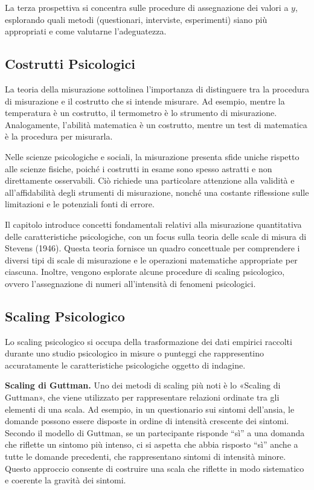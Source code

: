 \documentclass[
  letterpaper,
]{krantz}
\begin{document}
La terza prospettiva si concentra sulle procedure di assegnazione dei
valori a \(y\), esplorando quali metodi (questionari, interviste,
esperimenti) siano più appropriati e come valutarne l'adeguatezza.

\subsection{Costrutti Psicologici}\label{costrutti-psicologici}

La teoria della misurazione sottolinea l'importanza di distinguere tra
la procedura di misurazione e il costrutto che si intende misurare. Ad
esempio, mentre la temperatura è un costrutto, il termometro è lo
strumento di misurazione. Analogamente, l'abilità matematica è un
costrutto, mentre un test di matematica è la procedura per misurarla.

Nelle scienze psicologiche e sociali, la misurazione presenta sfide
uniche rispetto alle scienze fisiche, poiché i costrutti in esame sono
spesso astratti e non direttamente osservabili. Ciò richiede una
particolare attenzione alla validità e all'affidabilità degli strumenti
di misurazione, nonché una costante riflessione sulle limitazioni e le
potenziali fonti di errore.

Il capitolo introduce concetti fondamentali relativi alla misurazione
quantitativa delle caratteristiche psicologiche, con un focus sulla
teoria delle scale di misura di Stevens (1946). Questa teoria fornisce
un quadro concettuale per comprendere i diversi tipi di scale di
misurazione e le operazioni matematiche appropriate per ciascuna.
Inoltre, vengono esplorate alcune procedure di scaling psicologico,
ovvero l'assegnazione di numeri all'intensità di fenomeni psicologici.

\subsection{Scaling Psicologico}\label{scaling-psicologico}

Lo scaling psicologico si occupa della trasformazione dei dati empirici
raccolti durante uno studio psicologico in misure o punteggi che
rappresentino accuratamente le caratteristiche psicologiche oggetto di
indagine.

\textbf{Scaling di Guttman.} Uno dei metodi di scaling più noti è lo
«Scaling di Guttman», che viene utilizzato per rappresentare relazioni
ordinate tra gli elementi di una scala. Ad esempio, in un questionario
sui sintomi dell'ansia, le domande possono essere disposte in ordine di
intensità crescente dei sintomi. Secondo il modello di Guttman, se un
partecipante risponde ``sì'' a una domanda che riflette un sintomo più
intenso, ci si aspetta che abbia risposto ``sì'' anche a tutte le
domande precedenti, che rappresentano sintomi di intensità minore.
Questo approccio consente di costruire una scala che riflette in modo
sistematico e coerente la gravità dei sintomi.
\end{document}
